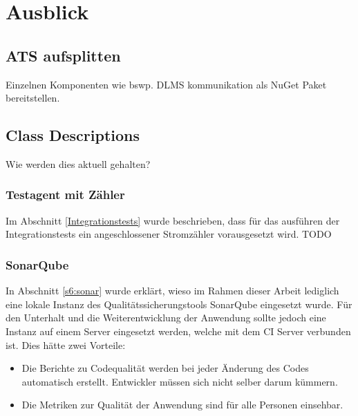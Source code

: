 
\chapter{Ausblick}

\section{ATS aufsplitten}\label{ausblick:ats_split}
Einzelnen Komponenten wie bswp. DLMS kommunikation als NuGet Paket bereitstellen.


\section{Class Descriptions}
Wie werden dies aktuell gehalten?


\subsection{Testagent mit Zähler}
Im Abschnitt \ref{Integrationstests} wurde beschrieben, dass für das ausführen der Integrationstests ein angeschlossener Stromzähler vorausgesetzt wird.
TODO

\subsection{SonarQube}
In Abschnitt \ref{s6:sonar} wurde erklärt, wieso im Rahmen dieser Arbeit lediglich eine lokale Instanz des Qualitätssicherungstools SonarQube eingesetzt wurde.
Für den Unterhalt und die Weiterentwicklung der Anwendung sollte jedoch eine Instanz auf einem Server eingesetzt werden, welche mit dem \ac{CI} Server verbunden ist.
Dies hätte zwei Vorteile:
\begin{itemize}
   \item Die Berichte zu Codequalität werden bei jeder Änderung des Codes automatisch erstellt. 
Entwickler müssen sich nicht selber darum kümmern.
   \item Die Metriken zur Qualität der Anwendung sind für alle Personen einsehbar.
\end{itemize}
